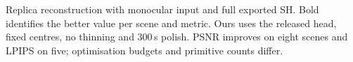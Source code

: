 \begin{table}[t]
\centering\small
\setlength{\tabcolsep}{3.5pt}

\caption[Rendering on Replica, all eight scenes]{Replica reconstruction
with monocular input and full exported SH. Bold identifies the better value
per scene and metric. Ours uses the released head, fixed centres, no thinning
and 300\,s polish. PSNR improves on eight scenes and LPIPS on five;
optimisation budgets and primitive counts differ.}
\label{tab:replica}
\end{table}
